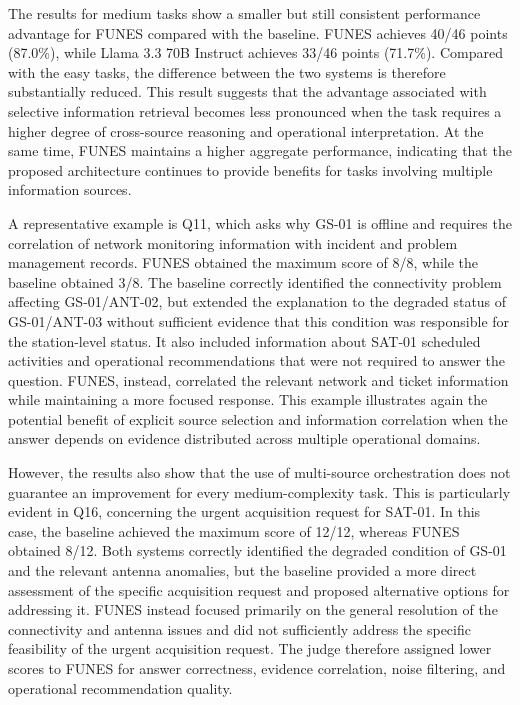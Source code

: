 The results for medium tasks show a smaller but still consistent performance advantage for FUNES compared with the baseline. FUNES achieves 40/46 points (87.0\%), while Llama 3.3 70B Instruct achieves 33/46 points (71.7\%). Compared with the easy tasks, the difference between the two systems is therefore substantially reduced. This result suggests that the advantage associated with selective information retrieval becomes less pronounced when the task requires a higher degree of cross-source reasoning and operational interpretation. At the same time, FUNES maintains a higher aggregate performance, indicating that the proposed architecture continues to provide benefits for tasks involving multiple information sources.

A representative example is Q11, which asks why GS-01 is offline and requires the correlation of network monitoring information with incident and problem management records. FUNES obtained the maximum score of 8/8, while the baseline obtained 3/8. The baseline correctly identified the connectivity problem affecting GS-01/ANT-02, but extended the explanation to the degraded status of GS-01/ANT-03 without sufficient evidence that this condition was responsible for the station-level status. It also included information about SAT-01 scheduled activities and operational recommendations that were not required to answer the question. FUNES, instead, correlated the relevant network and ticket information while maintaining a more focused response. This example illustrates again the potential benefit of explicit source selection and information correlation when the answer depends on evidence distributed across multiple operational domains.

However, the results also show that the use of multi-source orchestration does not guarantee an improvement for every medium-complexity task. This is particularly evident in Q16, concerning the urgent acquisition request for SAT-01. In this case, the baseline achieved the maximum score of 12/12, whereas FUNES obtained 8/12. Both systems correctly identified the degraded condition of GS-01 and the relevant antenna anomalies, but the baseline provided a more direct assessment of the specific acquisition request and proposed alternative options for addressing it. FUNES instead focused primarily on the general resolution of the connectivity and antenna issues and did not sufficiently address the specific feasibility of the urgent acquisition request. The judge therefore assigned lower scores to FUNES for answer correctness, evidence correlation, noise filtering, and operational recommendation quality.

